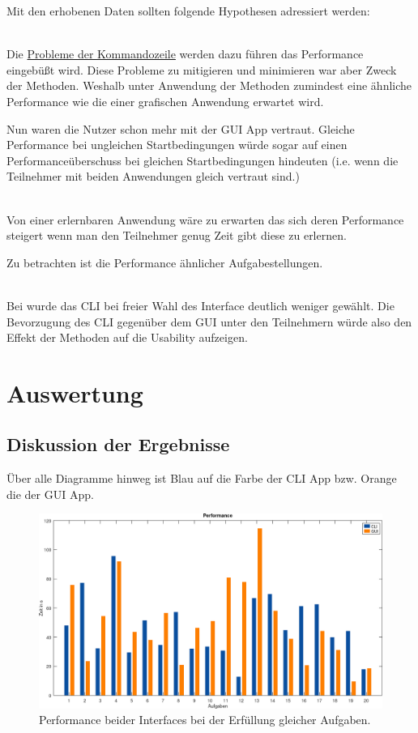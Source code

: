 \documentclass[oneside,bibliography=totocnumbered,BCOR=5mm]{scrbook}
\begin{document}
Mit den erhobenen Daten sollten folgende Hypothesen adressiert werden:

\\
Die \hyperref[sec:cli-problems]{Probleme der Kommandozeile} werden dazu führen
das Performance eingebüßt wird. Diese Probleme zu mitigieren und minimieren war
aber Zweck der Methoden. Weshalb unter Anwendung der Methoden zumindest eine
ähnliche Performance wie die einer grafischen Anwendung erwartet wird.

Nun waren die Nutzer schon mehr mit der GUI App vertraut. Gleiche Performance
bei ungleichen Startbedingungen würde sogar auf einen Performanceüberschuss
bei gleichen Startbedingungen hindeuten (i.e. wenn die Teilnehmer mit beiden
Anwendungen gleich vertraut sind.)

\\
Von einer erlernbaren Anwendung wäre zu erwarten das sich deren Performance
steigert wenn man den Teilnehmer genug Zeit gibt diese zu erlernen.

Zu betrachten ist die Performance ähnlicher Aufgabestellungen.

\\
Bei \textcite{Westerman_1997} wurde das CLI bei freier Wahl des Interface
deutlich weniger gewählt. Die Bevorzugung des CLI gegenüber dem GUI unter den
Teilnehmern würde also den Effekt der Methoden auf die Usability aufzeigen.

\section{Auswertung}
\label{sec:auswertung}

\subsection{Diskussion der Ergebnisse}

Über alle Diagramme hinweg ist Blau auf die Farbe der CLI App bzw. Orange die
der GUI App.

\begin{figure}[H]
  \centering
  \includegraphics[scale=0.36]{performance.png}
  \caption{Performance beider Interfaces bei der Erfüllung gleicher Aufgaben.}
  \label{fig:performance}
\end{figure}
\end{document}
